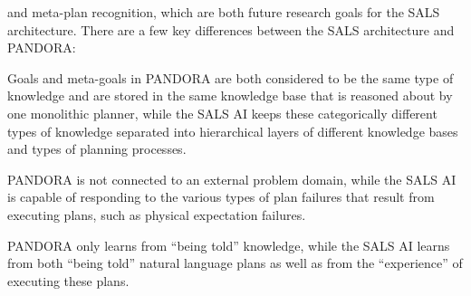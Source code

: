and meta-plan recognition, which are both future research goals for
the SALS architecture.  There are a few key differences between the
SALS architecture and PANDORA:
\begin{packed_enumerate}
\item{Goals and meta-goals in PANDORA are both considered to be the
  same type of knowledge and are stored in the same knowledge base
  that is reasoned about by one monolithic planner, while the SALS AI
  keeps these categorically different types of knowledge separated
  into hierarchical layers of different knowledge bases and types of
  planning processes.}
\item{PANDORA is not connected to an external problem domain, while
  the SALS AI is capable of responding to the various types of plan
  failures that result from executing plans, such as physical
  expectation failures.}
\item{PANDORA only learns from ``being told'' knowledge, while the
  SALS AI learns from both ``being told'' natural language plans as
  well as from the ``experience'' of executing these plans.}
\end{packed_enumerate}


